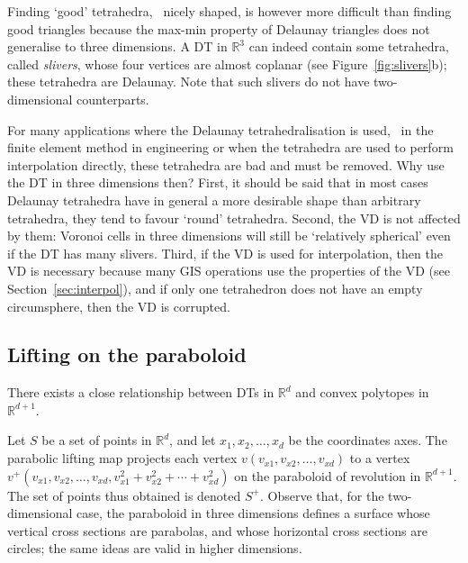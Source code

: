 %

Finding `good' tetrahedra, \ie\ nicely shaped, is however more difficult than finding good triangles because the max-min property of Delaunay triangles does not generalise to three dimensions. 
A DT in $\mathbb{R}^3$ can indeed contain some tetrahedra, called \emph{slivers}, 
whose four vertices are almost coplanar (see Figure~\ref{fig:slivers}b); these tetrahedra are Delaunay. 
Note that such slivers do not have two-dimensional counterparts.

%

For many applications where the Delaunay tetrahedralisation is used, \eg\ in the finite element method in engineering or when the tetrahedra are used to perform interpolation directly, these tetrahedra are bad and must be removed. 
Why use the DT in three dimensions then?
First, it should be said that in most cases Delaunay tetrahedra have in general a more desirable shape than arbitrary tetrahedra, they tend to favour `round' tetrahedra. 
Second, the VD is not affected by them: Voronoi cells in three dimensions will still be `relatively spherical' even if the DT has many slivers. 
Third, if the VD is used for interpolation, then the VD is necessary because many GIS operations use the properties of the VD (see Section~\ref{sec:interpol}), and if only one tetrahedron does not have an empty circumsphere, then the VD is corrupted.



\subsection{Lifting on the paraboloid}%
\label{sec:parabolic_lifting}

There exists a close relationship between DTs in $\mathbb{R}^{d}$ and convex polytopes in $\mathbb{R}^{d+1}$. 

Let $S$ be a set of points in $\mathbb{R}^{d}$, and let $x_{1}, x_{2}, \ldots , x_{d}$ be the coordinates axes. 
The parabolic lifting map projects each vertex $v(v_{x1}, v_{x2}, \ldots , v_{xd})$ to a vertex $v^{+}(v_{x1}, v_{x2}, \ldots , v_{xd}, v_{x1}^{2}+v_{x2}^{2}+\cdots+v_{xd}^{2})$ on the paraboloid of revolution in $\mathbb{R}^{d+1}$. 
The set of points thus obtained is denoted $S^{+}$. 
Observe that, for the two-dimensional case, the paraboloid in three dimensions defines a surface whose vertical cross sections are parabolas, and whose horizontal cross sections are circles; the same ideas are valid in higher dimensions. 

